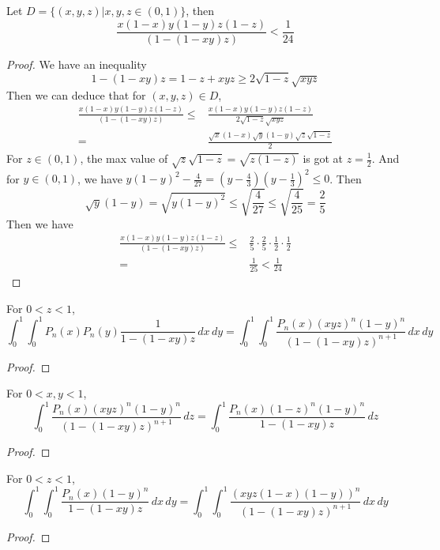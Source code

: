 \begin{lemma}\label{bound}
    Let $D = \{(x,y,z)|x,y,z\in (0,1)\}$, then
    \[ \frac{x(1-x)y(1-y)z(1-z)}{(1-(1-xy)z)} < \frac{1}{24} \]
\end{lemma}
\begin{proof}
    \leanok
    We have an inequality
    \[ 1-(1-xy)z = 1-z + xyz \geqslant 2\sqrt{1-z}\sqrt{xyz} \]
    Then we can deduce that for $(x,y,z) \in D$,
    \begin{align*}
        \frac{x(1-x)y(1-y)z(1-z)}{(1-(1-xy)z)} \leqslant& \frac{x(1-x)y(1-y)z(1-z)}{2\sqrt{1-z}\sqrt{xyz}}\\
        =&\frac{\sqrt{x}(1-x)\sqrt{y}(1-y)\sqrt{z}\sqrt{1-z}}{2}
    \end{align*}
    For $z\in (0,1)$, the max value of $\sqrt{z}\sqrt{1-z} = \sqrt{z(1-z)}$ is got at $z=\frac{1}{2}$.
    And for $y \in (0,1)$, we have $y(1-y)^2 - \frac{4}{27} = (y - \frac{4}{3})(y - \frac{1}{3})^2 \leqslant 0$. Then
    \[ \sqrt{y}(1-y) = \sqrt{y(1-y)^2} \leqslant \sqrt{\frac{4}{27}} \leqslant \sqrt{\frac{4}{25}} = \frac{2}{5}\]
    Then we have
    \begin{align*}
        \frac{x(1-x)y(1-y)z(1-z)}{(1-(1-xy)z)} \leqslant& \frac{2}{5}\cdot\frac{2}{5}\cdot\frac{1}{2}\cdot\frac{1}{2} \\
        =& \frac{1}{25} < \frac{1}{24} 
    \end{align*}
\end{proof}

\begin{lemma}\label{double_integral_eq1}
    For $0 < z < 1$, 
    \[ \int_{0}^{1}\int_{0}^{1} P_n(x)P_n(y) \frac{1}{1 - (1 - xy)z} \, dx \, dy = \int_{0}^{1}\int_{0}^{1} \frac{P_n(x)(xyz)^n(1-y)^n}{(1-(1-xy)z)^{n + 1}} \, dx \, dy \]
\end{lemma}
\begin{proof}
    \leanok
\end{proof}

\begin{lemma}\label{double_integral_eq2}
    For $0 < x, y < 1$, 
    \[ \int_{0}^{1} \frac{P_n(x)(xyz)^n(1-y)^n}{(1-(1-xy)z)^{n + 1}} \, dz = \int_{0}^{1} \frac{P_n(x)(1-z)^n(1-y)^n}{1-(1-xy)z}  \, dz \]
\end{lemma}
\begin{proof}
    \leanok
\end{proof}

\begin{lemma}\label{double_integral_eq3}
    For $0 < z < 1$, 
    \[ \int_{0}^{1}\int_{0}^{1} \frac{P_n(x)(1-y)^n}{1-(1-xy)z} \, dx \, dy = \int_{0}^{1}\int_{0}^{1} \frac{(xyz(1-x)(1-y))^n}{(1-(1-xy)z)^{n+1}} \, dx \, dy \]
\end{lemma}
\begin{proof}
    \leanok
\end{proof}

